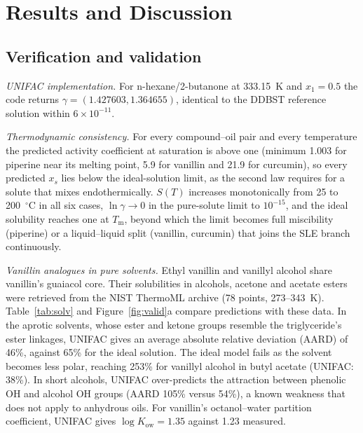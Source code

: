 \documentclass[journal=jceaax,manuscript=article,layout=twocolumn]{achemso}
\begin{document}
\section{Results and Discussion}

\subsection{Verification and validation}
\textit{UNIFAC implementation.} For n-hexane/2-butanone at 333.15~K and $x_1=0.5$ the code returns $\gamma=(1.427603, 1.364655)$, identical to the DDBST reference solution within $6\times10^{-11}$.

\textit{Thermodynamic consistency.} For every compound--oil pair and every temperature the predicted activity coefficient at saturation is above one (minimum 1.003 for piperine near its melting point, 5.9 for vanillin and 21.9 for curcumin), so every predicted $x_s$ lies below the ideal-solution limit, as the second law requires for a solute that mixes endothermically. $S(T)$ increases monotonically from 25 to 200~$^\circ$C in all six cases, $\ln\gamma\to0$ in the pure-solute limit to $10^{-15}$, and the ideal solubility reaches one at $T_\mathrm{m}$, beyond which the limit becomes full miscibility (piperine) or a liquid--liquid split (vanillin, curcumin) that joins the SLE branch continuously.

\textit{Vanillin analogues in pure solvents.} Ethyl vanillin\cite{wu2017} and vanillyl alcohol\cite{guo2017} share vanillin's guaiacol core. Their solubilities in alcohols, acetone and acetate esters were retrieved from the NIST ThermoML archive\cite{thermoml} (78 points, 273--343~K). Table~\ref{tab:solv} and Figure~\ref{fig:valid}a compare predictions with these data. In the aprotic solvents, whose ester and ketone groups resemble the triglyceride's ester linkages, UNIFAC gives an average absolute relative deviation (AARD) of 46\%, against 65\% for the ideal solution. The ideal model fails as the solvent becomes less polar, reaching 253\% for vanillyl alcohol in butyl acetate (UNIFAC: 38\%). In short alcohols, UNIFAC over-predicts the attraction between phenolic OH and alcohol OH groups (AARD 105\% versus 54\%), a known weakness that does not apply to anhydrous oils. For vanillin's octanol--water partition coefficient, UNIFAC gives $\log K_\mathrm{ow}=1.35$ against 1.23 measured.\cite{oecd_vanillin}
\end{document}
